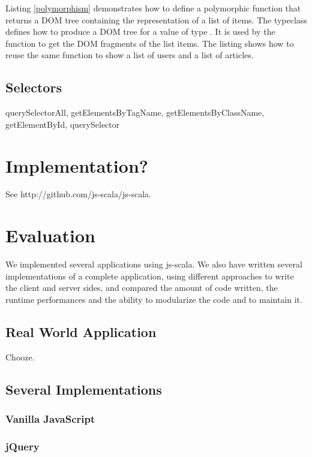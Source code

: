 \documentclass[preprint]{sigplanconf}
\begin{document}
Listing \ref{polymorphism} demonstrates how to define a polymorphic  function that returns a DOM
tree containing the representation of a list of items. The  typeclass defines how to produce a DOM tree
for a value of type . It is used by the  function to get the DOM fragments of the list
items. The listing shows how to reuse the same  function to show a list of users and a list of
articles.

\subsection{Selectors}

querySelectorAll, getElementsByTagName, getElementsByClassName, getElementById, querySelector

\section{Implementation?}

See http://github.com/js-scala/js-scala.

\section{Evaluation}
\label{validation}

We implemented several applications using js-scala. We also have written several implementations of a complete
application, using different approaches to write the client and server sides, and compared the amount of code
written, the runtime performances and the ability to modularize the code and to maintain it.

\subsection{Real World Application}

Chooze.

\subsection{Several Implementations}

\subsubsection{Vanilla JavaScript}

\subsubsection{jQuery}
\end{document}

